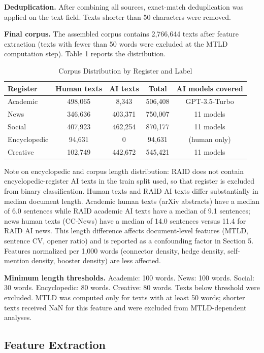 \documentclass{article}
\begin{document}
\textbf{Deduplication.} After combining all sources, exact-match deduplication was applied on the text field. Texts shorter than 50 characters were removed.

\textbf{Final corpus.} The assembled corpus contains 2,766,644 texts after feature extraction (texts with fewer than 50 words were excluded at the MTLD computation step). Table 1 reports the distribution.


\begin{table}[H]
\centering
\small
\begin{tabular}{lcccc}
\toprule
\textbf{Register} & \textbf{Human texts} & \textbf{AI texts} & \textbf{Total} & \textbf{AI models covered} \\
\midrule
Academic & 498,065 & 8,343 & 506,408 & GPT-3.5-Turbo \\
News & 346,636 & 403,371 & 750,007 & 11 models \\
Social & 407,923 & 462,254 & 870,177 & 11 models \\
Encyclopedic & 94,631 & 0 & 94,631 & (human only) \\
Creative & 102,749 & 442,672 & 545,421 & 11 models \\
\bottomrule
\end{tabular}
\caption{Corpus Distribution by Register and Label}
\end{table}

Note on encyclopedic and corpus length distribution: RAID does not contain encyclopedic-register AI texts in the train split used, so that register is excluded from binary classification. Human texts and RAID AI texts differ substantially in median document length. Academic human texts (arXiv abstracts) have a median of 6.0 sentences while RAID academic AI texts have a median of 9.1 sentences; news human texts (CC-News) have a median of 14.0 sentences versus 11.4 for RAID AI news. This length difference affects document-level features (MTLD, sentence CV, opener ratio) and is reported as a confounding factor in Section 5. Features normalized per 1,000 words (connector density, hedge density, self-mention density, booster density) are less affected.

\textbf{Minimum length thresholds.} Academic: 100 words. News: 100 words. Social: 30 words. Encyclopedic: 80 words. Creative: 80 words. Texts below threshold were excluded. MTLD was computed only for texts with at least 50 words; shorter texts received NaN for this feature and were excluded from MTLD-dependent analyses.

\subsection{Feature Extraction}
\end{document}
